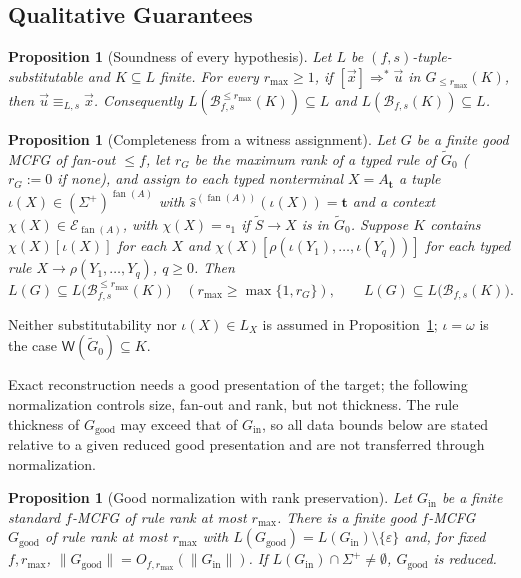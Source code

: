 \documentclass[11pt]{article}
\numberwithin{equation}{section}
\theoremstyle{plain}
\newtheorem{proposition}[theorem]{Proposition}
\theoremstyle{definition}
\theoremstyle{remark}
\newcommand{\Wit}{\mathsf{W}}
\newcommand{\tuple}[1]{\vec{#1}}
\newcommand{\blank}{\square}
\newcommand{\eps}{\varepsilon}
\newcommand{\fan}{\operatorname{fan}}
\theoremstyle{plain}
\begin{document}
\subsection{Qualitative Guarantees}
\label{sec:completeness}
\label{sec:poly-time}

\begin{proposition}[Soundness of every hypothesis]
\label{prop:reconstruction-soundness}
Let $L$ be $(f,s)$-tuple-substitutable and $K\subseteq L$ finite.  For every
$r_{\max}\ge1$, if $[\tuple x]\Rightarrow^*\tuple u$ in
$\widehat G_{\le r_{\max}}(K)$, then $\tuple u\equiv_{L,s}\tuple x$.
Consequently $L(\mathcal B_{f,s}^{\le r_{\max}}(K))\subseteq L$ and
$L(\mathcal B_{f,s}(K))\subseteq L$.
\end{proposition}

\begin{proposition}[Completeness from a witness assignment]
\label{prop:completeness}
Let $G$ be a finite good MCFG of fan-out $\le f$, let $r_G$ be the maximum
rank of a typed rule of $\widetilde G_0$ ($r_G:=0$ if none), and assign to
each typed nonterminal $X=A_{\mathbf t}$ a tuple
$\iota(X)\in(\Sigma^+)^{\fan(A)}$ with $\widehat s^{(\fan(A))}(\iota(X))=\mathbf t$
and a context $\chi(X)\in\mathcal E_{\fan(A)}$, with $\chi(X)=\blank_1$ if
$\widetilde S\to X$ is in $\widetilde G_0$.  Suppose $K$ contains
$\chi(X)[\iota(X)]$ for each $X$ and
$\chi(X)[\rho(\iota(Y_1),\ldots,\iota(Y_q))]$ for each
typed rule $X\to\rho(Y_1,\ldots,Y_q)$, $q\ge0$.  Then
\[
 L(G)\subseteq L\bigl(\mathcal B_{f,s}^{\le r_{\max}}(K)\bigr)
 \quad(r_{\max}\ge\max\{1,r_G\}),\qquad
 L(G)\subseteq L\bigl(\mathcal B_{f,s}(K)\bigr).
\]
\end{proposition}

Neither substitutability nor $\iota(X)\in L_X$ is assumed in
Proposition~\ref{prop:completeness}; $\iota=\omega$ is the case
$\Wit(\widetilde G_0)\subseteq K$.

Exact reconstruction needs a good presentation of the target; the following
normalization controls size, fan-out and rank, but not thickness.  The rule
thickness of $G_{\mathrm{good}}$ may exceed that of $G_{\mathrm{in}}$, so all
data bounds below are stated relative to a given reduced good presentation and
are not transferred through normalization.

\begin{proposition}[Good normalization with rank preservation]
\label{prop:good-normalization}
Let $G_{\mathrm{in}}$ be a finite standard $f$-MCFG of rule rank at most
$r_{\max}$.  There is a finite good $f$-MCFG $G_{\mathrm{good}}$ of rule rank at
most $r_{\max}$ with $L(G_{\mathrm{good}})=L(G_{\mathrm{in}})\setminus\{\eps\}$
and, for fixed $f,r_{\max}$,
$\|G_{\mathrm{good}}\|=O_{f,r_{\max}}(\|G_{\mathrm{in}}\|)$.  If
$L(G_{\mathrm{in}})\cap\Sigma^+\ne\emptyset$, $G_{\mathrm{good}}$ is reduced.
\end{proposition}
\end{document}
